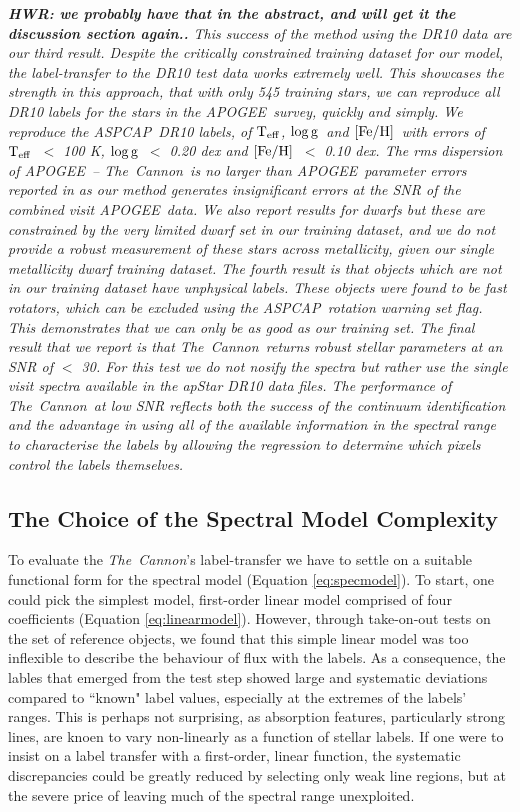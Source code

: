 \documentclass[12pt, preprint]{aastex}
\newcommand{\teff}{\mbox{$\rm T_{eff}$}}
\newcommand{\feh}{\mbox{$\rm [Fe/H]$}}
\newcommand{\logg}{\mbox{$\rm \log g$}}
\newcommand{\tc}{\textsl{The~Cannon}}
\newcommand{\apogee}{\textsl{APOGEE}}
\newcommand{\aspcap}{\textsl{ASPCAP}}
\begin{document}
\textit{{\bf{HWR: we probably have that in the abstract, and will get it  the discussion section again..}} This success of the method using the DR10 data are our third result. 
Despite the critically constrained training dataset for our model, the label-transfer to the DR10 test data works extremely well.
This showcases the strength in this approach, that with only 545 training stars, we can reproduce all DR10 labels for the stars in the \apogee\ survey, quickly and simply.  
We reproduce the \aspcap\ DR10 labels, of \teff, \logg\ and \feh\ with errors of \teff\ $<$ 100 K, \logg\ $<$ 0.20 dex and \feh\ $<$ 0.10 dex. 
The rms dispersion of \apogee\ -- \tc\ is no larger than \apogee\ parameter errors reported in \citep{Meszaros2013} as our method generates insignificant errors at the SNR of the combined visit \apogee\ data.
We also report results for dwarfs but these are constrained by the very limited dwarf set in our training dataset, and we do not provide a robust measurement of these stars across metallicity, given our single metallicity dwarf training dataset.
The fourth result is that objects which are not in our training dataset have unphysical labels. 
These objects were found to be fast rotators, which can be excluded using the \aspcap\ rotation warning set flag. 
This demonstrates that we can only be as good as our training set. 
The final result that we report is that \tc\ returns robust stellar parameters at an SNR of $<$ 30. 
For this test we do not nosify the spectra but rather use the single visit spectra available in the \textit{apStar} DR10 data files. 
The performance of \tc\ at low SNR reflects both the success of the continuum identification and the advantage in using \textit{all} of the available information in the spectral range to characterise the labels by allowing the regression to determine which pixels control the labels themselves.}


\subsection{The Choice of the Spectral Model Complexity} 

To evaluate the \tc 's label-transfer we have to settle on a suitable functional form for the spectral model  (Equation \ref{eq:specmodel}). To start, one could pick the simplest model, first-order linear model comprised of four coefficients (Equation \ref{eq:linearmodel}). 
However, through take-on-out tests on the set of reference objects, we found that this simple linear model was too inflexible to describe the behaviour of flux with the labels. As a consequence, the lables that emerged from the test step showed large and systematic deviations compared to ``known" label values, especially at the extremes of the labels' ranges. 
This is perhaps not surprising, as absorption features, particularly strong lines, are knoen to vary non-linearly as a function of stellar labels. If one were to insist on a label transfer with a first-order, linear function, the systematic discrepancies could be greatly reduced by selecting only weak line regions, but at the severe price of leaving much of the spectral range unexploited.
\end{document}
